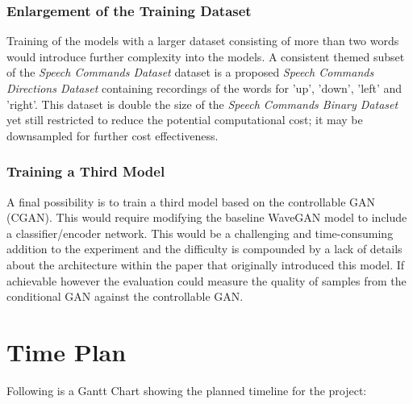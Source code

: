 \documentclass[a4paper, dvipsnames, titlepage]{article}
\begin{document}
\subsubsection{Enlargement of the Training Dataset}

Training of the models with a larger dataset consisting of more than two words would introduce further complexity into the models.
A consistent themed subset of the \textit{Speech Commands Dataset} dataset is a proposed \textit{Speech Commands Directions Dataset} containing recordings of the words for 'up', 'down', 'left' and 'right'.
This dataset is double the size of the \textit{Speech Commands Binary Dataset} yet still restricted to reduce the potential computational cost; it may be downsampled for further cost effectiveness.

\subsubsection{Training a Third Model}

A final possibility is to train a third model based on the controllable GAN (CGAN).
This would require modifying the baseline WaveGAN model to include a classifier/encoder network.
This would be a challenging and time-consuming addition to the experiment and the difficulty is compounded by a lack of details about the architecture within the paper that originally introduced this model.
If achievable however the evaluation could measure the quality of samples from the conditional GAN against the controllable GAN.

\newpage

\section{Time Plan}

Following is a Gantt Chart showing the planned timeline for the project:
\newline
\newline
\end{document}
